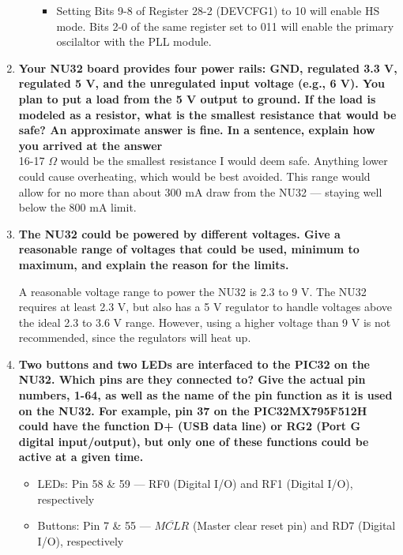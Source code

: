 \documentclass{article}
\begin{document}
\begin{enumerate}[label=\textbf{\arabic*})]
\begin{enumerate}[label=\textbf{\alph*}.]
        \begin{itemize}
            \item Setting Bits 9-8 of Register 28-2 (DEVCFG1) to 10 will enable HS mode. 
            Bits 2-0 of the same register set to 011 will enable the primary oscilaltor with the 
            PLL module.
        \end{itemize}
        
    \end{enumerate}

    \item \textbf{Your NU32 board provides four power rails: GND, regulated 3.3 V, regulated 5 V, and
    the unregulated input voltage (e.g., 6 V). You plan to put a load from the 5 V output to
    ground. If the load is modeled as a resistor, what is the smallest resistance that would be
    safe? An approximate answer is fine. In a sentence, explain how you arrived at the
    answer} \\

    16-17 $\Omega$ would be the smallest resistance I would deem safe. Anything lower could cause overheating, 
    which would be best avoided. This range would allow for no more than about 300 mA draw from the NU32 --- 
    staying well below the 800 mA limit.

    \pagebreak
    \item \textbf{The NU32 could be powered by different voltages. Give a reasonable range of voltages
    that could be used, minimum to maximum, and explain the reason for the limits.}

    A reasonable voltage range to power the NU32 is 2.3 to 9 V. The NU32 requires at least 2.3 V, but also
    has a 5 V regulator to handle voltages above the ideal 2.3 to 3.6 V range. However, using a higher
    voltage than 9 V is not recommended, since the regulators will heat up. 

    \item \textbf{Two buttons and two LEDs are interfaced to the PIC32 on the NU32. Which pins are
    they connected to? Give the actual pin numbers, 1-64, as well as the name of the pin
    function as it is used on the NU32. For example, pin 37 on the PIC32MX795F512H
    could have the function D+ (USB data line) or RG2 (Port G digital input/output), but
    only one of these functions could be active at a given time.} \\

    \begin{itemize}
        \item LEDs: Pin 58 \& 59 --- RF0 (Digital I/O) and RF1 (Digital I/O), respectively
        \item Buttons: Pin 7 \& 55 --- $\overline{MCLR}$ (Master clear reset pin) and 
        RD7 (Digital I/O), respectively
    \end{itemize}


\end{enumerate}
\end{document}
